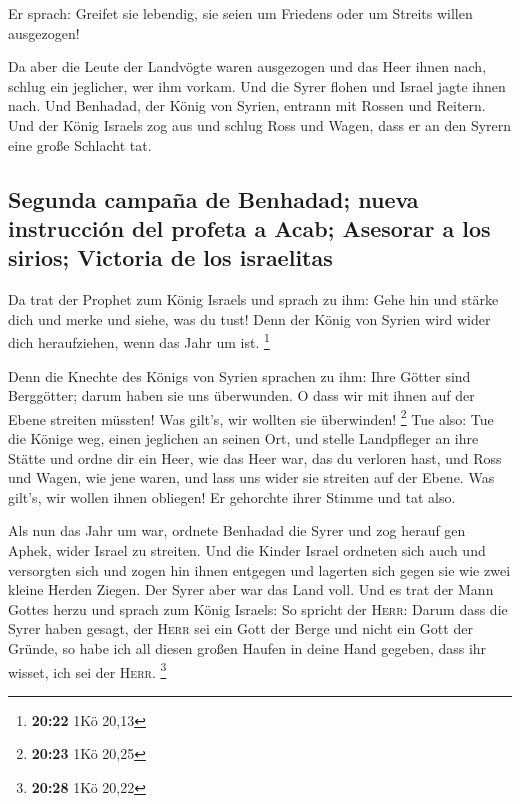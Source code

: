  Er sprach: Greifet sie lebendig, sie seien um Friedens
oder um Streits willen ausgezogen!

 Da aber die Leute der Landvögte waren ausgezogen und das
Heer ihnen nach,  schlug ein jeglicher, wer ihm vorkam.
Und die Syrer flohen und Israel jagte ihnen nach. Und Benhadad, der
König von Syrien, entrann mit Rossen und Reitern.  Und
der König Israels zog aus und schlug Ross und Wagen, dass er an den
Syrern eine große Schlacht tat.

\hypertarget{segunda-campauxf1a-de-benhadad-nueva-instrucciuxf3n-del-profeta-a-acab-asesorar-a-los-sirios-victoria-de-los-israelitas}{%
\subsection{Segunda campaña de Benhadad; nueva instrucción del profeta a
Acab; Asesorar a los sirios; Victoria de los
israelitas}\label{segunda-campauxf1a-de-benhadad-nueva-instrucciuxf3n-del-profeta-a-acab-asesorar-a-los-sirios-victoria-de-los-israelitas}}

 Da trat der Prophet zum König Israels und sprach zu ihm:
Gehe hin und stärke dich und merke und siehe, was du tust! Denn der
König von Syrien wird wider dich heraufziehen, wenn das Jahr um ist.
\footnote{\textbf{20:22} 1Kö 20,13}

 Denn die Knechte des Königs von Syrien sprachen zu ihm:
Ihre Götter sind Berggötter; darum haben sie uns überwunden. O dass wir
mit ihnen auf der Ebene streiten müssten! Was gilt's, wir wollten sie
überwinden! \footnote{\textbf{20:23} 1Kö 20,25}  Tue
also: Tue die Könige weg, einen jeglichen an seinen Ort, und stelle
Landpfleger an ihre Stätte  und ordne dir ein Heer, wie
das Heer war, das du verloren hast, und Ross und Wagen, wie jene waren,
und lass uns wider sie streiten auf der Ebene. Was gilt's, wir wollen
ihnen obliegen! Er gehorchte ihrer Stimme und tat also.

 Als nun das Jahr um war, ordnete Benhadad die Syrer und
zog herauf gen Aphek, wider Israel zu streiten.  Und die
Kinder Israel ordneten sich auch und versorgten sich und zogen hin ihnen
entgegen und lagerten sich gegen sie wie zwei kleine Herden Ziegen. Der
Syrer aber war das Land voll.  Und es trat der Mann
Gottes herzu und sprach zum König Israels: So spricht der \textsc{Herr}:
Darum dass die Syrer haben gesagt, der \textsc{Herr} sei ein Gott der
Berge und nicht ein Gott der Gründe, so habe ich all diesen großen
Haufen in deine Hand gegeben, dass ihr wisset, ich sei der
\textsc{Herr}. \footnote{\textbf{20:28} 1Kö 20,22}

